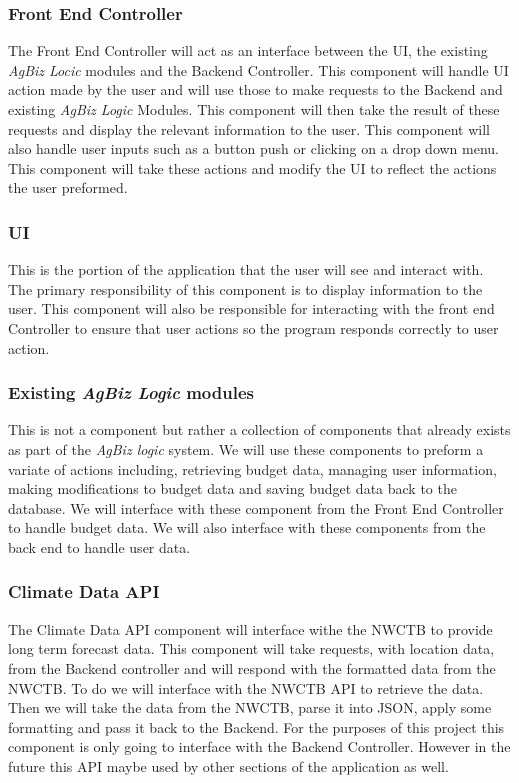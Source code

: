\documentclass[onecolumn, draftclsnofoot,10pt, compsoc]{article}
\begin{document}
		\subsubsection{Front End Controller}
			The Front End Controller will act as an interface between the UI, the existing \textit{AgBiz Locic} modules and the Backend Controller. This component will handle UI action made by the user and will use those to make requests to the Backend and existing \textit{AgBiz Logic} Modules. This component will then take the result of these requests and display the relevant information to the user. This component will also handle user inputs such as a button push or clicking on a drop down menu. This component will take these actions and modify the UI to reflect the actions the user preformed.\\

		\subsubsection{UI}
			This is the portion of the application that the user will see and interact with. The primary responsibility of this component is to display information to the user. This component will also be responsible for interacting with the front end Controller to ensure that user actions so the program responds correctly to user action.\\

		\subsubsection{Existing \textit{AgBiz Logic} modules}
			This is not a component but rather a collection of components that already exists as part of the \textit{AgBiz logic} system. We will use these components to preform a variate of actions including, retrieving budget data, managing user information, making modifications to budget data and saving budget data back to the database. We will interface with these component from the Front End Controller to handle budget data. We will also interface with these components from the back end to handle user data.\\


		\subsubsection{Climate Data API}
			The Climate Data API component will interface withe the NWCTB to provide long term forecast data. This component will take requests, with location data, from the Backend controller and will respond with the formatted data from the NWCTB. To do we will interface with the NWCTB API to retrieve the data. Then we will take the data from the NWCTB, parse it into JSON, apply some formatting and pass it back to the Backend. For the purposes of this project this component is only going to interface with the Backend Controller. However in the future this API maybe used by other sections of the application as well.\\
\end{document}

